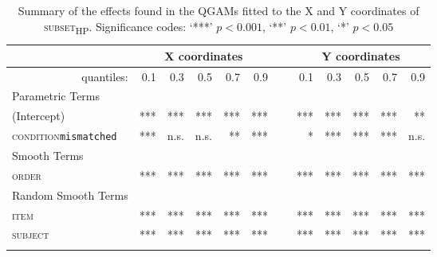 \begin{table}\fontsize{9}{10}
\caption{Summary of the effects found in the QGAMs fitted to the X and Y coordinates of \textsc{subset\textsubscript{HP}}. Significance codes: `***' $p < 0.001$, `**' $p < 0.01$, `*' $p < 0.05$}
\label{tab:8.7}
\centering
\begin{tabular}{lrrrrrrrrrrr}
\lsptoprule
~                   & \multicolumn{5}{c}{X coordinates}       & \multicolumn{1}{c}{}                       & \multicolumn{5}{c}{Y coordinates}                               \\
\midrule
\multicolumn{1}{r}{quantiles:}          & 0.1        & 0.3        & 0.5        & 0.7        & 0.9 & ~       & 0.1        & 0.3        & 0.5        & 0.7        & 0.9         \\
\midrule
Parametric Terms    & \textbf{~} & \textbf{~} & \textbf{~} & \textbf{~} & \textbf{~} & \textbf{~} & \textbf{~} & \textbf{~} & \textbf{~} & \textbf{~}  \\
\midrule
(Intercept)         & ***        & ***        & ***        & ***        & *** & ~       & ***        & ***        & ***        & ***        & **          \\
\textsc{condition}\texttt{mismatched} & ***       & n.s.          & n.s.        & **        & ***  & ~      & *       & ***        & ***        & ***        & n.s.         \\
\midrule
Smooth Terms        & \textbf{~} & \textbf{~} & \textbf{~} & \textbf{~} & \textbf{~} & \textbf{~} & \textbf{~} & \textbf{~} & \textbf{~} & \textbf{~}  \\
\midrule
\textsc{order}               & ***        & ***        & ***        & ***        & ***   & ~     & ***        & ***        & ***        & ***        & ***         \\
\midrule
Random Smooth Terms & \textbf{~} & \textbf{~} & \textbf{~} & \textbf{~} & \textbf{~} & \textbf{~} & \textbf{~} & \textbf{~} & \textbf{~} & \textbf{~}  \\
\midrule
\textsc{item}                & ***        & ***        & ***        & ***        & ***  & ~      & ***        & ***        & ***        & ***        & ***         \\
\textsc{subject}             & ***        & ***        & ***        & ***        & ***  & ~      & ***        & ***        & ***        & ***        & ***        \\
\lspbottomrule
\end{tabular}
\end{table}

